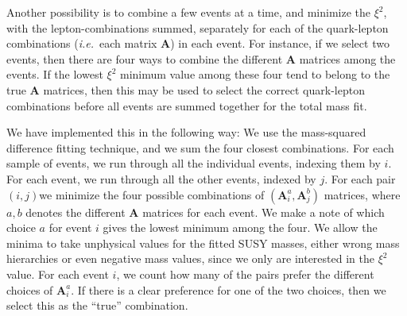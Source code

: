 \documentclass[twoside,english]{uiofysmaster}
\begin{document}
Another possibility is to combine a few events at a time, and minimize the $\xi^2$, with the lepton-combinations summed, separately for each of the quark-lepton combinations ({\it i.e.}\ each matrix $\mathbf{A}$) in each event. For instance, if we select two events, then there are four ways to combine the different $\mathbf{A}$ matrices among the events. If the lowest $\xi^2$ minimum value among these four tend to belong to the true $\mathbf{A}$ matrices, then this may be used to select the correct quark-lepton combinations before all events are summed together for the total mass fit. 

We have implemented this in the following way: We use the mass-squared difference fitting technique, and we sum the four closest combinations. For each sample of events, we run through all the individual events, indexing them by $i$. For each event, we run through all the other events, indexed by $j$. For each pair $(i,j)$we minimize the four possible combinations of $(\mathbf{A}_i^a, \mathbf{A}_j^b)$ matrices, where $a,b$ denotes the different $\mathbf{A}$ matrices for each event. We make a note of which choice $a$ for event $i$ gives the lowest minimum among the four. We allow the minima to take unphysical values for the fitted SUSY masses, either wrong mass hierarchies or even negative mass values, since we only are interested in the $\xi^2$ value. For each event $i$, we count how many of the pairs prefer the different choices of $\mathbf{A}_i^a$. If there is a clear preference for one of the two choices, then we select this as the ``true'' combination.
\end{document}
